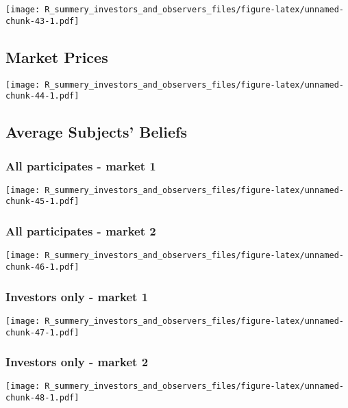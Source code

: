 \documentclass[]{article}
\begin{document}
\texttt{[image: R\_summery\_investors\_and\_observers\_files/figure-latex/unnamed-chunk-43-1.pdf]}

\hypertarget{market-prices-3}{%
\subsection{Market Prices}\label{market-prices-3}}

\texttt{[image: R\_summery\_investors\_and\_observers\_files/figure-latex/unnamed-chunk-44-1.pdf]}

\hypertarget{average-subjects-beliefs-3}{%
\subsection{Average Subjects'
Beliefs}\label{average-subjects-beliefs-3}}

\hypertarget{all-participates---market-1-3}{%
\subsubsection{All participates - market
1}\label{all-participates---market-1-3}}

\texttt{[image: R\_summery\_investors\_and\_observers\_files/figure-latex/unnamed-chunk-45-1.pdf]}

\hypertarget{all-participates---market-2-3}{%
\subsubsection{All participates - market
2}\label{all-participates---market-2-3}}

\texttt{[image: R\_summery\_investors\_and\_observers\_files/figure-latex/unnamed-chunk-46-1.pdf]}

\hypertarget{investors-only---market-1-3}{%
\subsubsection{Investors only - market
1}\label{investors-only---market-1-3}}

\texttt{[image: R\_summery\_investors\_and\_observers\_files/figure-latex/unnamed-chunk-47-1.pdf]}

\hypertarget{investors-only---market-2-3}{%
\subsubsection{Investors only - market
2}\label{investors-only---market-2-3}}

\texttt{[image: R\_summery\_investors\_and\_observers\_files/figure-latex/unnamed-chunk-48-1.pdf]}
\end{document}
